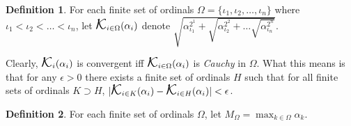 \documentclass[
]{article}
\DeclareMathOperator*{\kap}{\text{\Large{$\mathcal K$}}}
\theoremstyle{theorem}
\theoremstyle{lemma}
\theoremstyle{corollary}
\theoremstyle{remark}
\theoremstyle{definition}
\newtheorem*{definition}{Definition}
\begin{document}
\begin{definition}
For each finite set of ordinals \(\Omega=\{\iota_1, \iota_2, \dotsc, \iota_n\}\) where \(\iota_1 < \iota_2 < \dotsc < \iota_n\), let \(\kap_{i \in \Omega} (\alpha_i)\) denote \(\sqrt{\alpha_{\iota_1}^{2^1} + \sqrt{\alpha_{\iota_2}^{2^2} + \dotsc \sqrt{\alpha_{\iota_n}^{2^n}}}}\).
\end{definition}

Clearly, \(\kap_i(\alpha_i)\) is convergent iff \(\kap_{i \in \Omega}(\alpha_i)\) is \emph{Cauchy} in \(\Omega\). What this means is that for any \(\epsilon>0\) there exists a finite set of ordinals \(H\) such that for all finite sets of ordinals \(K \supset H\), \(\lvert\kap_{i \in K}(\alpha_i) - \kap_{i \in H}(\alpha_i)\rvert < \epsilon\).

\begin{definition}
For each finite set of ordinals \(\Omega\), let \(M_\Omega = \max_{k \in \Omega} \alpha_k\).
\end{definition}
\end{document}
